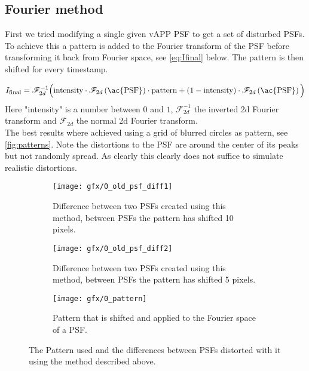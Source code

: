 \subsection{Fourier method}
First we tried modifying a single given \ac{vAPP} \ac{PSF} to get a set of disturbed \acp{PSF}. To achieve this a pattern is added to the Fourier transform of the \ac{PSF} before transforming it back from Fourier space, see \autoref{eq:Ifinal} below. The pattern is then shifted for every timestamp.

\begin{equation}
I_{\text{final}} = \mathscr{F}_{2d}^{-1} \Big( \text{intensity} \cdot \mathscr{F}_{2d}\left(\text{\ac{PSF}}\right) \cdot \text{pattern} + \left(1-\text{intensity}\right) \cdot \mathscr{F}_{2d}\left(\text{\ac{PSF}}\right) \Big) \label{eq:Ifinal}
\end{equation}
Here "intensity" is a number between $0$ and $1$, $\mathscr{F}_{2d}^{-1}$ the inverted 2d Fourier transform and $\mathscr{F}_{2d}$ the normal 2d Fourier transform.\\

The best results where achieved using a grid of blurred circles as pattern, see \autoref{fig:patterns}. Note the distortions to the \ac{PSF} are around the center of its peaks but not randomly spread. As clearly this clearly does not suffice to simulate realistic distortions.

\begin{figure}[h!]
      \begin{subfigure}[t]{0.5\textwidth}
        \texttt{[image: gfx/0\_old\_psf\_diff1]}
        \caption{Difference between two \acp{PSF}  created using this method, between \acp{PSF} the pattern has shifted 10 pixels.}
      \end{subfigure}%
      \begin{subfigure}[t]{0.5\textwidth}
        \texttt{[image: gfx/0\_old\_psf\_diff2]}
        \caption{Difference between two \acp{PSF}  created using this method, between \acp{PSF} the pattern has shifted 5 pixels.}
      \end{subfigure}
      
      \begin{subfigure}[]{0.5\textwidth}
        \texttt{[image: gfx/0\_pattern]}
        \caption{Pattern that is shifted and applied to the Fourier space of a \ac{PSF}.}
      \end{subfigure}
      
  \caption{The Pattern used and the differences between \acp{PSF} distorted with it using the method described above.}
  \label{fig:patterns}
\end{figure}

